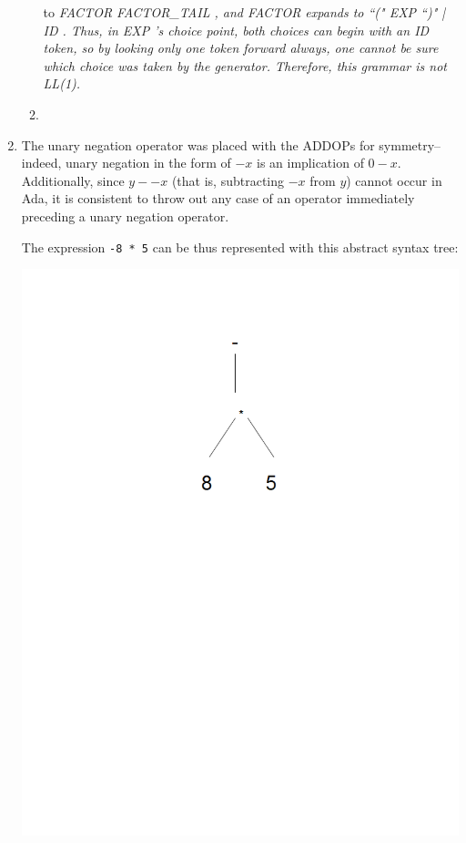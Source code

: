 \documentclass[landscape]{report}
\begin{document}
\begin{enumerate}
\begin{enumerate}
        to \em FACTOR FACTOR\_TAIL \em, and \em FACTOR \em expands to \em ``("
        EXP ``)" | ID \em. Thus, in \em EXP \em's choice point, both choices
        can begin with an \em ID \em token, so by looking only one token
        forward always, one cannot be sure which choice was taken by the
        generator. Therefore, this grammar is not LL(1).
      \item %
        
    \end{enumerate}
    \item %
      The unary negation operator was placed with the ADDOPs for symmetry--
      indeed, unary negation in the form of $-x$ is an implication of $0-x$.
      Additionally, since $y--x$ (that is, subtracting $-x$ from $y$) cannot
      occur in Ada, it is consistent to throw out any case of an operator
      immediately preceding a unary negation operator.
      
      The expression \lstinline{-8 * 5} can be thus represented with this
      abstract syntax tree:
      
      \includegraphics{img/prob5.png}
      

\end{enumerate}
\end{document}
